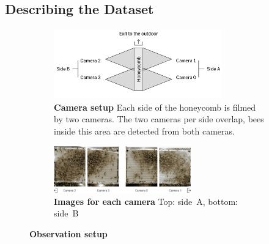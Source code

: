 \subsection{Describing the Dataset}
\label{sec:dataset}

\begin{figure}
    \centering
    \begin{subfigure}[b]{\textwidth}
	\centering
	\includegraphics[width=0.8\textwidth]{Figures/setupCams}
	\caption[Camera setup]{\textbf{Camera setup} Each side of the honeycomb is filmed by two cameras. The two cameras per side overlap, bees inside this area are detected from both cameras.}
	\label{fig:cams}
	\vspace{5mm}
    \end{subfigure}
    \begin{subfigure}[b]{\textwidth}
	\centering
	\includegraphics[width=0.65\textwidth]{Figures/beesClose}
	\vspace{5mm}
	\caption[Images for each camera]{\textbf{Images for each camera} Top: side~A, bottom: side~B}
	\label{fig:veryclose}
    \end{subfigure}
 	\caption[Observation setup]{\textbf{Observation setup}}
 	\label{fig:obssetup}
\end{figure}

